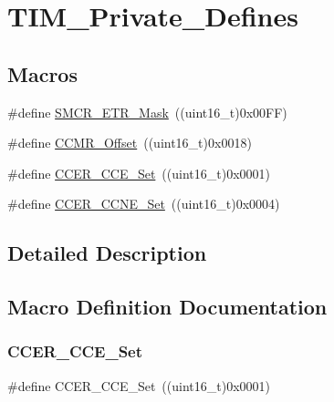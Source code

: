 \hypertarget{group___t_i_m___private___defines}{}\section{T\+I\+M\+\_\+\+Private\+\_\+\+Defines}
\label{group___t_i_m___private___defines}
\subsection*{Macros}
\begin{DoxyCompactItemize}
\item 
\#define \mbox{\hyperlink{group___t_i_m___private___defines_ga43819484b70fd8f2f2aa02d4131c9841}{S\+M\+C\+R\+\_\+\+E\+T\+R\+\_\+\+Mask}}~((uint16\+\_\+t)0x00\+F\+F)
\item 
\#define \mbox{\hyperlink{group___t_i_m___private___defines_ga76469c9f56da4e7705336a6ac0248196}{C\+C\+M\+R\+\_\+\+Offset}}~((uint16\+\_\+t)0x0018)
\item 
\#define \mbox{\hyperlink{group___t_i_m___private___defines_ga17c4ed624aa62f19fd496c3f3bd61137}{C\+C\+E\+R\+\_\+\+C\+C\+E\+\_\+\+Set}}~((uint16\+\_\+t)0x0001)
\item 
\#define \mbox{\hyperlink{group___t_i_m___private___defines_ga167dfdf613827d1fdf2e4152497b4bd5}{C\+C\+E\+R\+\_\+\+C\+C\+N\+E\+\_\+\+Set}}~((uint16\+\_\+t)0x0004)
\end{DoxyCompactItemize}


\subsection{Detailed Description}


\subsection{Macro Definition Documentation}
\mbox{\label{group___t_i_m___private___defines_ga17c4ed624aa62f19fd496c3f3bd61137}} 
\subsubsection{\texorpdfstring{CCER\_CCE\_Set}{CCER\_CCE\_Set}}
{\footnotesize\ttfamily \#define C\+C\+E\+R\+\_\+\+C\+C\+E\+\_\+\+Set~((uint16\+\_\+t)0x0001)}

